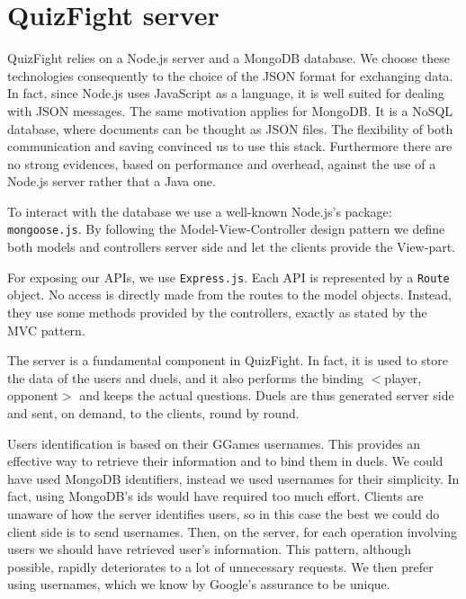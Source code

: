 \section{QuizFight server}

QuizFight relies on a Node.js server and a MongoDB database.
We choose these technologies consequently to the choice of the JSON format for
exchanging data.
In fact, since Node.js uses JavaScript as a language, it is well suited for
dealing with JSON messages.
The same motivation applies for MongoDB. It is a NoSQL database, where
documents can be thought as JSON files.
The flexibility of both communication and saving convinced us to use this
stack.
Furthermore there are no strong evidences, based on performance and overhead,
against the use of a Node.js server rather that a Java one. 

To interact with the database we use a well-known Node.js's package:
\texttt{mongoose.js}.
By following the Model-View-Controller design pattern we define both
models and controllers server side and let the clients provide the View-part.

For exposing our APIs, we use \texttt{Express.js}.
Each API is represented by a \texttt{Route} object.
No access is directly made from the routes to the model objects.
Instead, they use some methods provided by the controllers, exactly as stated
by the MVC pattern.

The server is a fundamental component in QuizFight. In fact, it is used to
store the data of the users and duels, and it also performs the binding
$<$player, opponent$>$ and keeps the actual questions.
Duels are thus generated server side and sent, on demand, to the clients,
round by round.

Users identification is based on their GGames usernames.
This provides an effective way to retrieve their information and to bind
them in duels.
We could have used MongoDB identifiers, instead we used usernames for their
simplicity.
In fact, using MongoDB's ids would have required too much effort.
Clients are unaware of how the server identifies users, so in this case the
best we could do client side is to send usernames.
Then, on the server, for each operation involving users we should have
retrieved user's information.
This pattern, although possible, rapidly deteriorates to a lot of unnecessary
requests.
We then prefer using usernames, which we know by Google's assurance to be
unique.

